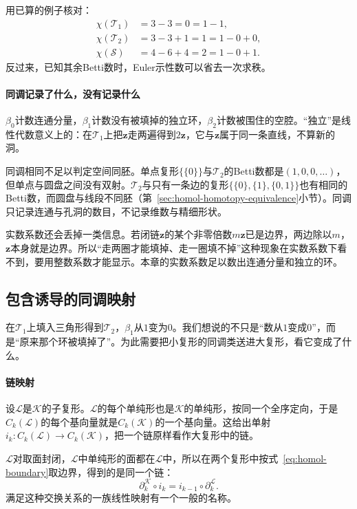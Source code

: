 用已算的例子核对：
\[
 \begin{aligned}
 \chi(\mathcal T_1)&=3-3=0=1-1,\\
 \chi(\mathcal T_2)&=3-3+1=1=1-0+0,\\
 \chi(\mathcal S)&=4-6+4=2=1-0+1.
 \end{aligned}
\]
反过来，已知其余Betti数时，Euler示性数可以省去一次求秩。

\paragraph{同调记录了什么，没有记录什么}
$\beta_0$计数连通分量，$\beta_1$计数没有被填掉的独立环，$\beta_2$计数被围住的空腔。“独立”是线性代数意义上的：在$\mathcal T_1$上把$\bm z$走两遍得到$2\bm z$，它与$\bm z$属于同一条直线，不算新的洞。

同调相同不足以判定空间同胚。单点复形$\{\{0\}\}$与$\mathcal T_2$的Betti数都是$(1,0,0,\ldots)$，但单点与圆盘之间没有双射。$\mathcal T_2$与只有一条边的复形$\bigl\{\{0\},\{1\},\{0,1\}\bigr\}$也有相同的Betti数，而圆盘与线段不同胚（第~\ref{sec:homol-homotopy-equivalence}小节）。同调只记录连通与孔洞的数目，不记录维数与精细形状。

实数系数还会丢掉一类信息。若闭链$\bm z$的某个非零倍数$m\bm z$已是边界，两边除以$m$，$\bm z$本身就是边界。所以“走两圈才能填掉、走一圈填不掉”这种现象在实数系数下看不到，要用整数系数才能显示。本章的实数系数足以数出连通分量和独立的环。

\subsection{包含诱导的同调映射}
\label{sec:homol-induced-inclusion}

在$\mathcal T_1$上填入三角形得到$\mathcal T_2$，$\beta_1$从$1$变为$0$。我们想说的不只是“数从$1$变成$0$”，而是“原来那个环被填掉了”。为此需要把小复形的同调类送进大复形，看它变成了什么。

\paragraph{链映射}
设$\mathcal L$是$\mathcal K$的子复形。$\mathcal L$的每个单纯形也是$\mathcal K$的单纯形，按同一个全序定向，于是$C_k(\mathcal L)$的每个基向量就是$C_k(\mathcal K)$的一个基向量。这给出单射$i_k:C_k(\mathcal L)\to C_k(\mathcal K)$，把一个链原样看作大复形中的链。

$\mathcal L$对取面封闭，$\mathcal L$中单纯形的面都在$\mathcal L$中，所以在两个复形中按式~\eqref{eq:homol-boundary}取边界，得到的是同一个链：
\[
 \partial_k^{\mathcal K}\circ i_k=i_{k-1}\circ\partial_k^{\mathcal L}.
\]
满足这种交换关系的一族线性映射有一个一般的名称。

